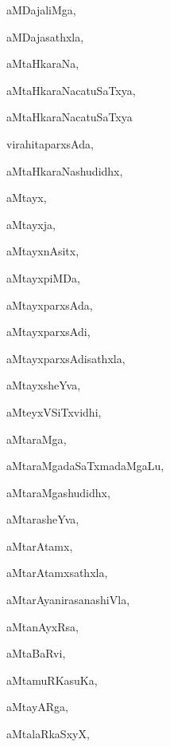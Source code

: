 \begin{multicols}{3}
{\noindent
{aMDajaliMga}, \pageref{aMDajaliMga}

\noindent
{aMDajasathxla}, \pageref{aMDajasathxla}

\noindent
{aMtaHkaraNa}, \pageref{aMtaHkaraNa}

\noindent
{aMtaHkaraNacatuSaTxya}, \pageref{aMtaHkaraNacatuSaTxya}

\noindent
{aMtaHkaraNacatuSaTxya}

\noindent
\qquad virahitaparxsAda, \pageref{aMtaHkaraNacatuSaTxyavirahitaparxsAda}

\noindent
{aMtaHkaraNashudidhx}, \pageref{aMtaHkaraNashudidhx}

\noindent
{aMtayx}, \pageref{aMtayx}

\noindent
{aMtayxja}, \pageref{aMtayxja}

\noindent
{aMtayxnAsitx}, \pageref{aMtayxnAsitx}

\noindent
{aMtayxpiMDa}, \pageref{aMtayxpiMDa}

\noindent
{aMtayxparxsAda}, \pageref{aMtayxparxsAda}

\noindent
{aMtayxparxsAdi}, \pageref{aMtayxparxsAdi}

\noindent
{aMtayxparxsAdisathxla}, \pageref{aMtayxparxsAdisathxla}

\noindent
{aMtayxsheYva}, \pageref{aMtayxsheYva}

\noindent
{aMteyxVSiTxvidhi}, \pageref{aMteyxVSiTxvidhi}

\noindent
{aMtaraMga}, \pageref{aMtaraMga}

\noindent
{aMtaraMgadaSaTxmadaMgaLu}, \pageref{aMtaraMgadaSaTxmadaMgaLu}

\noindent
{aMtaraMgashudidhx}, \pageref{aMtaraMgashudidhx}

\noindent
{aMtarasheYva}, \pageref{aMtarasheYva}

\noindent
{aMtarAtamx}, \pageref{aMtarAtamx}

\noindent
{aMtarAtamxsathxla}, \pageref{aMtarAtamxsathxla}

\noindent
{aMtarAyanirasanashiVla}, \pageref{aMtarAyanirasanashiVla}

\noindent
{aMtanAyxRsa}, \pageref{aMtanAyxRsa}

\noindent
{aMtaBaRvi}, \pageref{aMtaBaRvi}

\noindent
{aMtamuRKasuKa}, \pageref{aMtamuRKasuKa}

\noindent
{aMtayARga}, \pageref{aMtayARga}

\noindent
{aMtalaRkaSxyX}, \pageref{aMtalaRkaSxyX}

}
\end{multicols}
